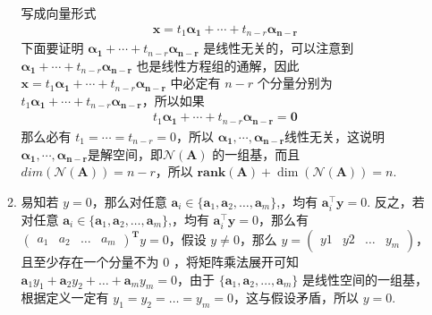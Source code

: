\documentclass[11pt,letter,notitlepage]{article}
\newcommand{\rank}[1]{ \textbf{rank}  (#1)  }
\begin{document}
\begin{solution}
\begin{enumerate}
\begin{enumerate}
			写成向量形式
			\begin{align*}
				\mathbf{x} = t_{1} \mathbf{\alpha_{1}}+\cdots+t_{n-r} \mathbf{ \alpha_{n-r}}
			\end{align*}	
			下面要证明 $\mathbf{\alpha_{1}}+\cdots+t_{n-r} \mathbf{ \alpha_{n-r}}$ 是线性无关的，可以注意到 $\mathbf{\alpha_{1}}+\cdots+t_{n-r} \mathbf{ \alpha_{n-r}}$ 也是线性方程组的通解，因此 $\mathbf{x} = t_{1} \mathbf{\alpha_{1}}+\cdots+t_{n-r} \mathbf{ \alpha_{n-r}}$ 中必定有 $ n - r$ 个分量分别为 $ t_{1} \mathbf{\alpha_{1}}+\cdots+t_{n-r} \mathbf{ \alpha_{n-r}}$，所以如果
			\begin{align*}
				t_{1} \mathbf{\alpha_{1}}+\cdots+t_{n-r} \mathbf{ \alpha_{n-r}} = \mathbf{0}
			\end{align*}
			那么必有 $t_{1} = \cdots = t_{n-r} = 0$，所以 $ \mathbf{\alpha_{1}} , \cdots , \mathbf{ \alpha_{n-r}} $线性无关，这说明$ \mathbf{\alpha_{1}} , \cdots , \mathbf{ \alpha_{n-r}} $是解空间，即$\mathcal{N}(\mathbf{A})$ 的一组基，而且 $ dim(\mathcal{N}(\mathbf{A})) = n - r$，所以 $\rank{\mathbf{A}} + \dim(\mathcal{N}(\mathbf{A} ) ) = n$.
			\item 易知若 $ y = 0 $，那么对任意 $\mathbf{a}_i \in \{\mathbf{a}_1,\mathbf{a}_2,\ldots,\mathbf{a}_m\}$,，均有 $\mathbf{a}_i^{\top}\mathbf{y} = 0$. 反之，若对任意 $\mathbf{a}_i \in \{\mathbf{a}_1,\mathbf{a}_2,\ldots,\mathbf{a}_m\}$,，均有 $\mathbf{a}_i^{\top}\mathbf{y} = 0$，那么有 $\begin{pmatrix}
				a_1 & a_2 & \dots & a_m
			\end{pmatrix}^{\mathbf{T}} y = 0 $，假设 $ y \neq 0$，那么 $y = \begin{pmatrix}
				y1 & y2 & \dots & y_m
			\end{pmatrix}$，且至少存在一个分量不为 0 ，将矩阵乘法展开可知 $\mathbf{a}_1y_1 + \mathbf{a}_2y_2 + \dots + \mathbf{a}_my_m = 0$，由于 $\{\mathbf{a}_1,\mathbf{a}_2,\ldots,\mathbf{a}_m\}$ 是线性空间的一组基，根据定义一定有 $y_1 = y_2 = \dots = y_m = 0$，这与假设矛盾，所以 $ y = 0$.
		\end{enumerate}
	\end{enumerate}

\end{solution}

\end{document}
